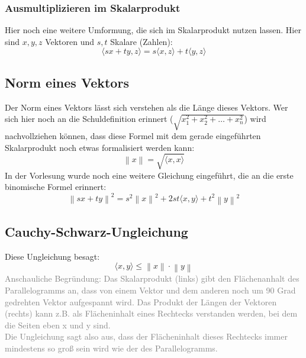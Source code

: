 \documentclass{article}
\begin{document}
			\subsubsection{Ausmultiplizieren im Skalarprodukt}
				Hier noch eine weitere Umformung, die sich im Skalarprodukt nutzen lassen. Hier sind $x, y, z$ Vektoren und $s, t$ Skalare (Zahlen):
				\begin{equation}
					\langle sx + ty, z \rangle = s\langle x, z \rangle + t\langle y, z \rangle
				\end{equation}
		\subsection{Norm eines Vektors}
			Der Norm eines Vektors lässt sich verstehen als die Länge dieses Vektors. Wer sich hier noch an die Schuldefinition erinnert ($\sqrt{x_1^2+x_2^2+\dots+x_n^2}$) wird nachvollziehen können, dass diese Formel mit dem gerade eingeführten Skalarprodukt noch etwas formalisiert werden kann:
			\begin{equation}
				\left\lVert x \right\rVert = \sqrt{\langle x, x \rangle}
			\end{equation}
			In der Vorlesung wurde noch eine weitere Gleichung eingeführt, die an die erste binomische Formel erinnert:
			\begin{equation}
					\left\lVert sx + ty \right\rVert^2 = s^2\left\lVert x \right\rVert^2 + 2st\langle x, y \rangle + t^2 \left\lVert y \right\rVert^2
			\end{equation}
		\subsection{Cauchy-Schwarz-Ungleichung}
			Diese Ungleichung besagt:
			\begin{equation}
				\langle x, y \rangle \leq \left\lVert x \right\rVert \cdot \left\lVert y \right\rVert
			\end{equation}	
			\textcolor{gray}{Anschauliche Begründung: Das Skalarprodukt (links) gibt den Flächenanhalt des Parallelogramms an, dass von einem Vektor und dem anderen noch um 90 Grad gedrehten Vektor aufgespannt wird. Das Produkt der Längen der Vektoren (rechts) kann z.B. als Flächeninhalt eines Rechtecks verstanden werden, bei dem die Seiten eben x und y sind.\\
			Die Ungleichung sagt also aus, dass der Flächeninhalt dieses Rechtecks immer mindestens so groß sein wird wie der des Parallelogramms.}
\end{document}

